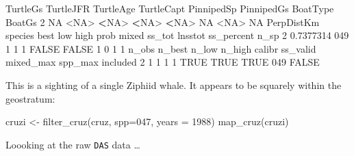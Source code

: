 \documentclass[
]{book}
\newenvironment{Shaded}{\begin{snugshade}}{\end{snugshade}}
\newcommand{\AttributeTok}[1]{\textcolor[rgb]{0.77,0.63,0.00}{#1}}
\newcommand{\ConstantTok}[1]{\textcolor[rgb]{0.00,0.00,0.00}{#1}}
\newcommand{\DecValTok}[1]{\textcolor[rgb]{0.00,0.00,0.81}{#1}}
\newcommand{\ErrorTok}[1]{\textcolor[rgb]{0.64,0.00,0.00}{\textbf{#1}}}
\newcommand{\FloatTok}[1]{\textcolor[rgb]{0.00,0.00,0.81}{#1}}
\newcommand{\FunctionTok}[1]{\textcolor[rgb]{0.00,0.00,0.00}{#1}}
\newcommand{\NormalTok}[1]{#1}
\newcommand{\OtherTok}[1]{\textcolor[rgb]{0.56,0.35,0.01}{#1}}
\newcommand{\SpecialCharTok}[1]{\textcolor[rgb]{0.00,0.00,0.00}{#1}}
\newcommand{\StringTok}[1]{\textcolor[rgb]{0.31,0.60,0.02}{#1}}
\begin{document}
\begin{Shaded}
\begin{Highlighting}[]
\NormalTok{  TurtleGs TurtleJFR TurtleAge TurtleCapt PinnipedSp PinnipedGs BoatType BoatGs}
\DecValTok{2}       \ConstantTok{NA}      \SpecialCharTok{\textless{}}\ConstantTok{NA}\SpecialCharTok{\textgreater{}}      \ErrorTok{\textless{}}\ConstantTok{NA}\SpecialCharTok{\textgreater{}}       \ErrorTok{\textless{}}\ConstantTok{NA}\SpecialCharTok{\textgreater{}}       \ErrorTok{\textless{}}\ConstantTok{NA}\SpecialCharTok{\textgreater{}}         \ConstantTok{NA}     \SpecialCharTok{\textless{}}\ConstantTok{NA}\SpecialCharTok{\textgreater{}}     \ConstantTok{NA}
\NormalTok{  PerpDistKm species best low high  prob mixed ss\_tot lnsstot ss\_percent n\_sp}
\DecValTok{2}  \FloatTok{0.7377314}     \DecValTok{049}    \DecValTok{1}   \DecValTok{1}    \DecValTok{1} \ConstantTok{FALSE} \ConstantTok{FALSE}      \DecValTok{1}       \DecValTok{0}          \DecValTok{1}    \DecValTok{1}
\NormalTok{  n\_obs n\_best n\_low n\_high calibr ss\_valid mixed\_max spp\_max included}
\DecValTok{2}     \DecValTok{1}      \DecValTok{1}     \DecValTok{1}      \DecValTok{1}   \ConstantTok{TRUE}     \ConstantTok{TRUE}      \ConstantTok{TRUE}     \DecValTok{049}    \ConstantTok{FALSE}
\end{Highlighting}
\end{Shaded}

This is a sighting of a single Ziphiid whale. It appears to be squarely within the geostratum:

\begin{Shaded}
\begin{Highlighting}[]
\NormalTok{cruzi }\OtherTok{\textless{}{-}} \FunctionTok{filter\_cruz}\NormalTok{(cruz, }\AttributeTok{spp=}\StringTok{\textquotesingle{}047\textquotesingle{}}\NormalTok{, }\AttributeTok{years =} \DecValTok{1988}\NormalTok{)}
\FunctionTok{map\_cruz}\NormalTok{(cruzi)}
\end{Highlighting}
\end{Shaded}

Loooking at the raw \texttt{DAS} data \ldots{}
\end{document}
